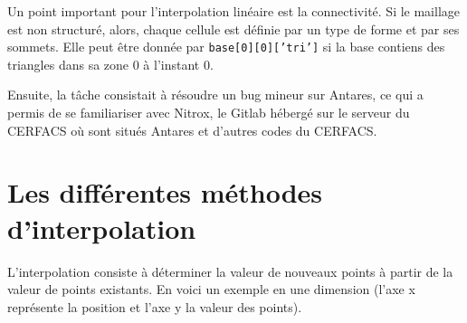 Un point important pour l'interpolation linéaire est la connectivité. Si le maillage est non structuré, alors, chaque cellule est définie par un type de forme et par ses sommets. Elle peut être donnée par \texttt{base[0][0]['tri']} si la base contiens des triangles dans sa zone 0 à l'instant 0.

Ensuite, la tâche consistait à résoudre un bug mineur sur Antares, ce qui a permis de se familiariser avec Nitrox, le Gitlab hébergé sur le serveur du CERFACS où sont situés Antares et d'autres codes du CERFACS.


\section{Les différentes méthodes d'interpolation}

L'interpolation consiste à déterminer la valeur de nouveaux points à partir de la valeur de points existants. En voici un exemple en une dimension (l'axe x représente la position et l'axe y la valeur des points).

\vspace{0,5cm}


\begin{center}
\end{center}

\vspace{0,5cm}

